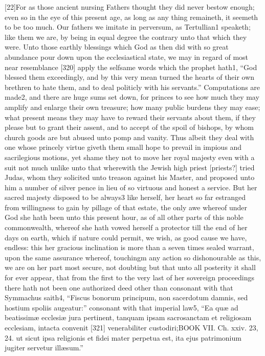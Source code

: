 [22]For as those ancient nursing Fathers thought they did never bestow enough; even so in the eye of this present age, as long as any thing remaineth, it seemeth to be too much. Our fathers we imitate in perversum, as Tertullian1 speaketh; like them we are, by being in equal degree the contrary unto that which they were. Unto those earthly blessings which God as then did with so great abundance pour down upon the ecclesiastical state, we may in regard of most near resemblance [320] apply the selfsame words which the prophet hath1, “God blessed them exceedingly, and by this very mean turned the hearts of their own brethren to hate them, and to deal politicly with his servants.” Computations are made2, and there are huge sums set down, for princes to see how much they may amplify and enlarge their own treasure; how many public burdens they may ease; what present means they may have to reward their servants about them, if they please but to grant their assent, and to accept of the spoil of bishops, by whom church goods are but abused unto pomp and vanity. Thus albeit they deal with one whose princely virtue giveth them small hope to prevail in impious and sacrilegious motions, yet shame they not to move her royal majesty even with a suit not much unlike unto that wherewith the Jewish high priest [priests?] tried Judas, whom they solicited unto treason against his Master, and proposed unto him a number of silver pence in lieu of so virtuous and honest a service. But her sacred majesty disposed to be always3 like herself, her heart so far estranged from willingness to gain by pillage of that estate, the only awe whereof under God she hath been unto this present hour, as of all other parts of this noble commonwealth, whereof she hath vowed herself a protector till the end of her days on earth, which if nature could permit, we wish, as good cause we have, endless: this her gracious inclination is more than a seven times sealed warrant, upon the same assurance whereof, touchingm any action so dishonourable as this, we are on her part most secure, not doubting but that unto all posterity it shall for ever appear, that from the first to the very last of her sovereign proceedings there hath not been one authorized deed other than consonant with that Symmachus saith4, “Fiscus bonorum principum, non sacerdotum damnis, sed hostium spoliis augeatur:” consonant with that imperial law5, “Ea quæ ad beatissimæ ecclesiæ jura pertinent, tanquam ipsam sacrosanctam et religiosam ecclesiam, intacta convenit [321] venerabiliter custodiri;BOOK VII. Ch. xxiv. 23, 24. ut sicut ipsa religionis et fidei mater perpetua est, ita ejus patrimonium jugiter servetur illæsum.”

